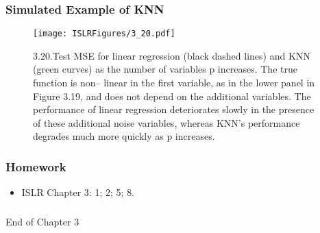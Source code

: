 \documentclass{beamer}
\begin{document}
      \begin{frame}
      	\frametitle{Simulated Example of KNN}
      	
      	\begin{figure}[h]
      		\centering
      		\texttt{[image: ISLRFigures/3\_20.pdf]}	 
      	
      	\caption{3.20.Test MSE for linear regression (black dashed lines) and KNN
      		(green curves) as the number of variables p increases. The true function is non–
      		linear in the first variable, as in the lower panel in Figure 3.19, and does not
      		depend on the additional variables. The performance of linear regression deteriorates
      		slowly in the presence of these additional noise variables, whereas KNN’s
      		performance degrades much more quickly as p increases. } 
      	\end{figure}
      	
      \end{frame}
      
      \begin{frame}
      	\frametitle{Homework }
      	
      \begin{itemize}
      	\item  ISLR Chapter 3: 1; 2; 5; 8.
      \end{itemize}
      \end{frame}
      
      
     
       \begin{frame}
       	\frametitle{  }
       	 
       	 \begin{center}
       	 	End of Chapter 3
       	 \end{center}
       \end{frame}
    
    
 
\end{document}
